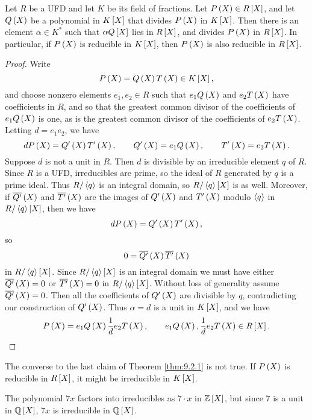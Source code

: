 \begin{theorem}
\label{thm:9.2.1}
Let $ R $ be a UFD and let $ K $ be its field of fractions. Let $ P\br{X} \in R\sbr{X} $, and let $ Q\br{X} $ be a polynomial in $ K\sbr{X} $ that divides $ P\br{X} $ in $ K\sbr{X} $. Then there is an element $ \alpha \in K^* $ such that $ \alpha Q\sbr{X} $ lies in $ R\sbr{X} $, and divides $ P\br{X} $ in $ R\sbr{X} $. In particular, if $ P\br{X} $ is reducible in $ K\sbr{X} $, then $ P\br{X} $ is also reducible in $ R\sbr{X} $.
\end{theorem}

\begin{proof}
Write
$$ P\br{X} = Q\br{X}T\br{X} \in K\sbr{X}, $$
and choose nonzero elements $ e_1, e_2 \in R $ such that $ e_1Q\br{X} $ and $ e_2T\br{X} $ have coefficients in $ R $, and so that the greatest common divisor of the coefficients of $ e_1Q\br{X} $ is one, as is the greatest common divisor of the coefficients of $ e_2T\br{X} $. Letting $ d = e_1e_2 $, we have
$$ dP\br{X} = Q'\br{X}T'\br{X}, \qquad Q'\br{X} = e_1Q\br{X}, \qquad T'\br{X} = e_2T\br{X}. $$
Suppose $ d $ is not a unit in $ R $. Then $ d $ is divisible by an irreducible element $ q $ of $ R $. Since $ R $ is a UFD, irreducibles are prime, so the ideal of $ R $ generated by $ q $ is a prime ideal. Thus $ R / \left\langle q \right\rangle $ is an integral domain, so $ R / \abr{q}\sbr{X} $ is as well. Moreover, if $ \overline{Q'}\br{X} $ and $ \overline{T'}\br{X} $ are the images of $ Q'\br{X} $ and $ T'\br{X} $ modulo $ \left\langle q \right\rangle $ in $ R / \abr{q}\sbr{X} $, then we have
$$ dP\br{X} = Q'\br{X}T'\br{X}, $$
so
$$ 0 = \overline{Q'}\br{X}\overline{T'}\br{X} $$
in $ R / \abr{q}\sbr{X} $. Since $ R / \abr{q}\sbr{X} $ is an integral domain we must have either $ \overline{Q'}\br{X} = 0 $ or $ \overline{T'}\br{X} = 0 $ in $ R / \abr{q}\sbr{X} $. Without loss of generality assume $ \overline{Q'}\br{X} = 0 $. Then all the coefficients of $ Q'\br{X} $ are divisible by $ q $, contradicting our construction of $ Q'\br{X} $. Thus $ \alpha = d $ is a unit in $ K\sbr{X} $, and we have
$$ P\br{X} = e_1Q\br{X}\dfrac{1}{d}e_2T\br{X}, \qquad e_1Q\br{X}, \dfrac{1}{d}e_2T\br{X} \in R\sbr{X}. $$
\end{proof}

\begin{note*}
The converse to the last claim of Theorem \ref{thm:9.2.1} is not true. If $ P\br{X} $ is reducible in $ R\sbr{X} $, it might be irreducible in $ K\sbr{X} $.
\end{note*}

\begin{example*}
The polynomial $ 7x $ factors into irreducibles as $ 7 \cdot x $ in $ \Z\sbr{X} $, but since $ 7 $ is a unit in $ \Q\sbr{X} $, $ 7x $ is irreducible in $ \Q\sbr{X} $.
\end{example*}

